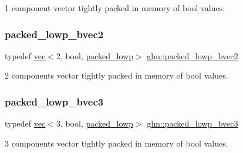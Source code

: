 1 component vector tightly packed in memory of bool values. 

\mbox{\label{group__gtc__type__aligned_gac3a7ad6d846a92b3e5d708cbb51b1f24}} 
\subsubsection{\texorpdfstring{packed\+\_\+lowp\+\_\+bvec2}{packed\_lowp\_bvec2}}
{\footnotesize\ttfamily typedef \hyperlink{structglm_1_1vec}{vec}$<$2, bool, \hyperlink{namespaceglm_a36ed105b07c7746804d7fdc7cc90ff25ac36a4bd74559be2c0b65bc48e5953b8b}{packed\+\_\+lowp}$>$ \hyperlink{group__gtc__type__aligned_gac3a7ad6d846a92b3e5d708cbb51b1f24}{glm\+::packed\+\_\+lowp\+\_\+bvec2}}



2 components vector tightly packed in memory of bool values. 

\mbox{\label{group__gtc__type__aligned_gae995413af4c773ede88dfa5b13a82fab}} 
\subsubsection{\texorpdfstring{packed\+\_\+lowp\+\_\+bvec3}{packed\_lowp\_bvec3}}
{\footnotesize\ttfamily typedef \hyperlink{structglm_1_1vec}{vec}$<$3, bool, \hyperlink{namespaceglm_a36ed105b07c7746804d7fdc7cc90ff25ac36a4bd74559be2c0b65bc48e5953b8b}{packed\+\_\+lowp}$>$ \hyperlink{group__gtc__type__aligned_gae995413af4c773ede88dfa5b13a82fab}{glm\+::packed\+\_\+lowp\+\_\+bvec3}}



3 components vector tightly packed in memory of bool values. 

\mbox{\label{group__gtc__type__aligned_ga7340a9bf8a974a263c6eaef48133331c}} 
